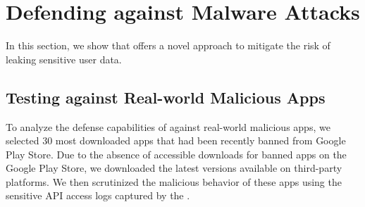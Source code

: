 \section{Defending against Malware Attacks}
\label{sec:mitigating_sca}


In this section, we show that \framework offers a novel approach to mitigate the
risk of leaking sensitive user data.

\subsection{Testing \framework{} against Real-world Malicious Apps}
\label{sec:malicious_apps}

To analyze the defense capabilities of \framework
against real-world malicious apps, we selected 30 most downloaded apps 
that had been recently banned from Google Play
Store. Due to the absence of accessible downloads for banned apps on the Google Play
Store, we downloaded the latest versions available on third-party platforms. 
We then scrutinized the malicious behavior of these apps using the sensitive API
access logs captured by the \framework.


